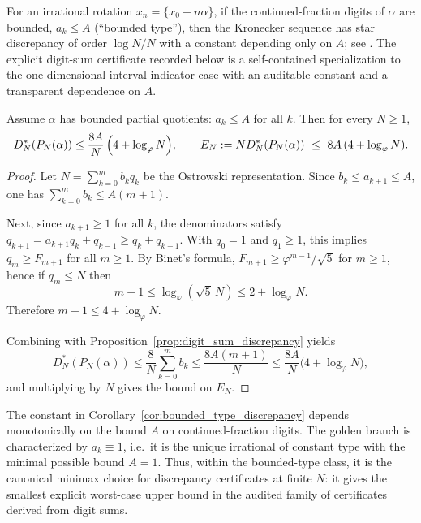 \begin{remark}
\label{rem:bounded_type_standard_reference}
For an irrational rotation $x_n=\{x_0+n\alpha\}$, if the continued-fraction digits of $\alpha$ are bounded, $a_k\le A$ (``bounded type''), then the Kronecker sequence has star discrepancy of order $\log N/N$ with a constant depending only on $A$; see \cite{KuipersNiederreiter1974,Cassels1957}.
The explicit digit-sum certificate recorded below is a self-contained specialization to the one-dimensional interval-indicator case with an auditable constant and a transparent dependence on $A$.
\end{remark}
\begin{corollary}
\label{cor:bounded_type_discrepancy}
Assume $\alpha$ has bounded partial quotients: $a_k\le A$ for all $k$.
Then for every $N\ge 1$,
\[
D_N^\ast(P_N(\alpha))
\le
\frac{8A}{N}\,\Bigl(4+\log_\varphi N\Bigr),
\qquad
E_N:=N D_N^\ast(P_N(\alpha))\ \le\ 8A\,(4+\log_\varphi N).
\]
\end{corollary}
\begin{proof}
Let $N=\sum_{k=0}^m b_k q_k$ be the Ostrowski representation.
Since $b_k\le a_{k+1}\le A$, one has $\sum_{k=0}^m b_k\le A(m+1)$.

Next, since $a_{k+1}\ge 1$ for all $k$, the denominators satisfy
$q_{k+1}=a_{k+1}q_k+q_{k-1}\ge q_k+q_{k-1}$.
With $q_0=1$ and $q_1\ge 1$, this implies $q_m\ge F_{m+1}$ for all $m\ge 1$.
By Binet's formula, $F_{m+1}\ge \varphi^{m-1}/\sqrt{5}$ for $m\ge 1$, hence
if $q_m\le N$ then
\[
m-1\le \log_\varphi(\sqrt{5}\,N)\le 2+\log_\varphi N.
\]
Therefore $m+1\le 4+\log_\varphi N$.

Combining with Proposition~\ref{prop:digit_sum_discrepancy} yields
\[
D_N^\ast(P_N(\alpha))
\le \frac{8}{N}\sum_{k=0}^{m} b_k
\le \frac{8A(m+1)}{N}
\le \frac{8A}{N}\bigl(4+\log_\varphi N\bigr),
\]
and multiplying by $N$ gives the bound on $E_N$.
\end{proof}

\begin{remark}
\label{rem:golden_minimax_discrepancy}
The constant in Corollary~\ref{cor:bounded_type_discrepancy} depends
monotonically on the bound $A$ on continued-fraction digits.
The golden branch is characterized by $a_k\equiv 1$, i.e.\ it is the unique
irrational of constant type with the minimal possible bound $A=1$.
Thus, within the bounded-type class, it is the canonical minimax choice for
discrepancy certificates at finite $N$:
it gives the smallest explicit worst-case upper bound in the audited family
of certificates derived from digit sums.
\end{remark}


